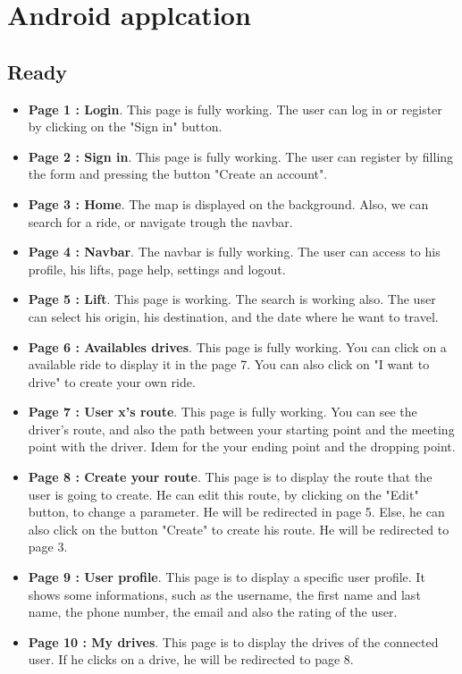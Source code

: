 \chapter{Android applcation}

\section{Ready}

\begin{itemize}
	\item {\bf Page 1 : Login}. This page is fully working. The user can log in or register by clicking on the "Sign in" button.
	\item {\bf Page 2 : Sign in}. This page is fully working. The user can register by filling the form and pressing the button "Create an account".
	\item {\bf Page 3 : Home}. The map is displayed on the background. Also, we can search for a ride, or navigate trough the navbar.
	\item {\bf Page 4 : Navbar}. The navbar is fully working. The user can access to his profile, his lifts, page help, settings and logout.
	\item {\bf Page 5 : Lift}. This page is working. The search is working also. The user can select his origin, his destination, and the date where he want to travel.
	\item {\bf Page 6 : Availables drives}. This page is fully working. You can click on a available ride to display it in the page 7. You can also click on "I want to drive" to create your own ride.
	\item {\bf Page 7 : User x's route}. This page is fully working. You can see the driver's route, and also the path between your starting point and the meeting point with the driver. Idem for the your ending point and the dropping point.
	\item {\bf Page 8 : Create your route}. This page is to display the route that the user is going to create. He can edit this route, by clicking on the "Edit" button, to change a parameter. He will be redirected in page 5. Else, he can also click on the button "Create" to create his route.  He will be redirected to page 3.
	\item {\bf Page 9 : User profile}. This page is to display a specific user profile. It shows some informations, such as the username, the first name and last name, the phone number, the email and also the rating of the user.
	 \item {\bf Page 10 : My drives}. This page is to display the drives of the connected user. If he clicks on a drive, he will be redirected to page 8.
\end{itemize}

